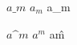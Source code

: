 \documentclass[fykos]{fksbatch}
\begin{document}
$a\_m$ $a_m$ a\_m

$a\^m$ $a^m$ a\^m
\end{document}
